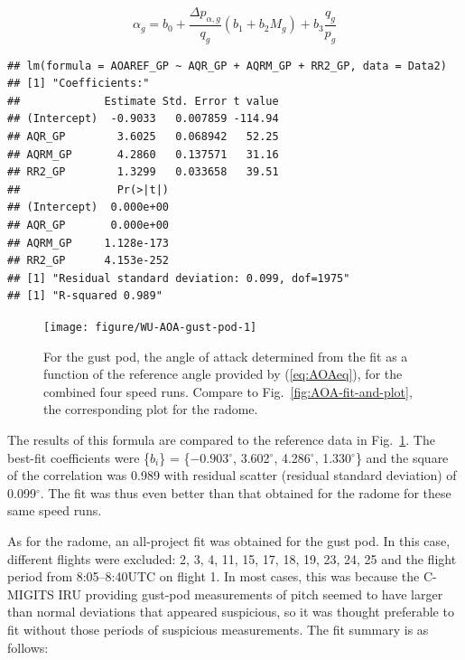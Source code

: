 \documentclass[12pt,twoside,english]{article}\usepackage[]{graphicx}\usepackage[]{color}
\makeatletter
\newenvironment{kframe}{%
 \def\at@end@of@kframe{}%
 \ifinner\ifhmode%
  \def\at@end@of@kframe{\end{minipage}}%
  \begin{minipage}{\columnwidth}%
 \fi\fi%
 \def\FrameCommand##1{\hskip\@totalleftmargin \hskip-\fboxsep
 \colorbox{shadecolor}{##1}\hskip-\fboxsep
     \hskip-\linewidth \hskip-\@totalleftmargin \hskip\columnwidth}%
 \MakeFramed {\advance\hsize-\width
   \@totalleftmargin\z@ \linewidth\hsize
   \@setminipage}}%
 {\par\unskip\endMakeFramed%
 \at@end@of@kframe}
\newenvironment{knitrout}{}{} %
\let\OrgIndex\index
\renewcommand*{\index}[1]{\OrgIndex{#1}}
\makeatother
\begin{document}
\begin{equation}
\alpha_{g}=b_{0}+\frac{\Delta p_{\alpha,g}}{q_{g}}(b_{1}+b_{2}M_{g})+b_{3}\frac{q_{g}}{p_{g}}\label{eq:AOAGfunction} 
\end{equation}


\begin{knitrout}\footnotesize
{}\color{fgcolor}\begin{kframe}
\begin{verbatim}
## lm(formula = AOAREF_GP ~ AQR_GP + AQRM_GP + RR2_GP, data = Data2)
## [1] "Coefficients:"
##             Estimate Std. Error t value
## (Intercept)  -0.9033   0.007859 -114.94
## AQR_GP        3.6025   0.068942   52.25
## AQRM_GP       4.2860   0.137571   31.16
## RR2_GP        1.3299   0.033658   39.51
##               Pr(>|t|)
## (Intercept)  0.000e+00
## AQR_GP       0.000e+00
## AQRM_GP     1.128e-173
## RR2_GP      4.153e-252
## [1] "Residual standard deviation: 0.099, dof=1975"
## [1] "R-squared 0.989"
\end{verbatim}
\end{kframe}\begin{figure}

{\centering \texttt{[image: figure/WU-AOA-gust-pod-1]} 

}

\caption[For the gust pod, the angle of attack determined from the fit as a function of the reference angle, for the combined four speed runs.]{For the gust pod, the angle of attack determined from the fit as a function of the reference angle provided by (\ref{eq:AOAeq}), for the combined four speed runs. Compare to Fig.~\ref{fig:AOA-fit-and-plot}, the corresponding plot for the radome.}\label{fig:AOA-gust-pod}
\end{figure}


\end{knitrout}

The results of this formula are compared to the reference data in 
Fig.~\ref{fig:AOA-gust-pod}. The best-fit coefficients were \{$b_{i}$\}%
= \{\ensuremath{-0.903}$^{\circ}$, 3.602$^{\circ}$, 4.286$^{\circ}$, 1.330$^{\circ}$\}  
and the square of the correlation was 0.989  
with residual scatter (residual standard deviation) of 0.099$^{\circ}$. %
The fit was thus even better than that obtained for the radome for these same speed runs. 



As for the radome, an all-project fit was obtained for the gust pod. In this case, different flights were excluded: 2, 3, 4, 11, 15, 17, 18, 19, 23, 24, 25 and the flight period from 8:05--8:40UTC on flight 1. In most cases, this was because the C-MIGITS IRU providing gust-pod measurements of pitch seemed to have larger than normal deviations that appeared suspicious, so it was thought preferable to fit without those periods of suspicious measurements. The fit summary is as follows:\label{aoa-coefficients-GP-all-flt}  
\end{document}
